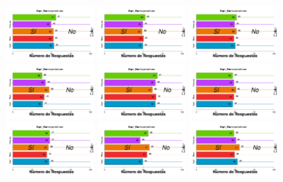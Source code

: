 \documentclass[a4paper ]{article}
\begin{document}
\begin{figure}[th]
\centering
\includegraphics[width=0.3\textwidth]{Figures/BiasColor_Exp1_P1} \includegraphics[width=0.3\textwidth]{Figures/BiasColor_Exp1_P2} \includegraphics[width=0.3\textwidth]{Figures/BiasColor_Exp1_P3}
\includegraphics[width=0.3\textwidth]{Figures/BiasColor_Exp1_P4} \includegraphics[width=0.3\textwidth]{Figures/BiasColor_Exp1_P5} \includegraphics[width=0.3\textwidth]{Figures/BiasColor_Exp1_P6}
\includegraphics[width=0.3\textwidth]{Figures/BiasColor_Exp1_P7} \includegraphics[width=0.3\textwidth]{Figures/BiasColor_Exp1_P8} \includegraphics[width=0.3\textwidth]{Figures/BiasColor_Exp1_P9}

\end{figure}
\end{document}
